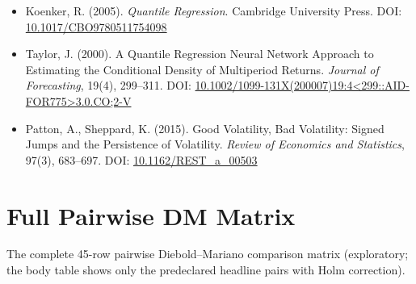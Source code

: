 \documentclass[11pt]{article}
\begin{document}
\begin{itemize}
\item Koenker, R. (2005). \emph{Quantile Regression}. Cambridge University Press. DOI: \url{10.1017/CBO9780511754098}
\item Taylor, J. (2000). A Quantile Regression Neural Network Approach to Estimating the Conditional Density of Multiperiod Returns. \emph{Journal of Forecasting}, 19(4), 299--311. DOI: \url{10.1002/1099-131X(200007)19:4<299::AID-FOR775>3.0.CO;2-V}
\item Patton, A., Sheppard, K. (2015). Good Volatility, Bad Volatility: Signed Jumps and the Persistence of Volatility. \emph{Review of Economics and Statistics}, 97(3), 683--697. DOI: \url{10.1162/REST\_a\_00503}
\end{itemize}

\appendix
\section{Full Pairwise DM Matrix}\label{sec:dmappendix}
The complete 45-row pairwise Diebold--Mariano comparison matrix (exploratory; the body table shows only the predeclared headline pairs with Holm correction).
\end{document}

